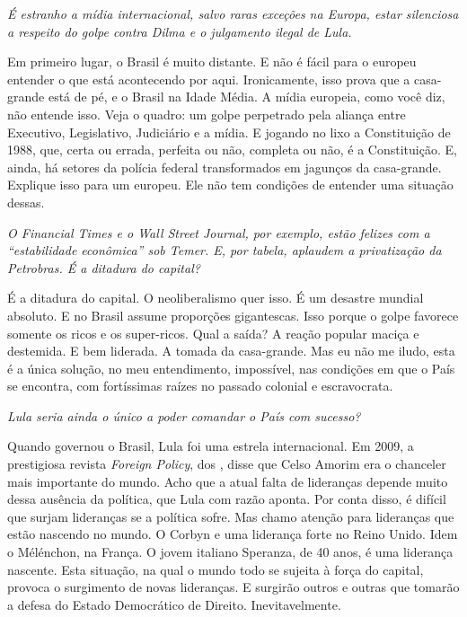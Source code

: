 \itshape
 É estranho a mídia internacional, salvo raras exceções
na Europa, estar silenciosa a respeito do golpe contra Dilma e o
julgamento ilegal de Lula.

\normalfont
Em primeiro lugar, o Brasil é muito distante. E não é
fácil para o europeu entender o que está acontecendo por aqui.
Ironicamente, isso prova que a casa-grande está de pé, e o Brasil na
Idade Média. A mídia europeia, como você diz, não entende isso. Veja o
quadro: um golpe perpetrado pela aliança entre Executivo, Legislativo,
Judiciário e a mídia. E jogando no lixo a Constituição de 1988, que,
certa ou errada, perfeita ou não, completa ou não, é a Constituição. E,
ainda, há setores da polícia federal transformados em jagunços da
casa-grande. Explique isso para um europeu. Ele não tem condições de
entender uma situação dessas.

\itshape
 O \emph{Financial Times} e o \emph{Wall Street
Journal}, por exemplo, estão felizes com a ``estabilidade econômica''
sob Temer. E, por tabela, aplaudem a privatização da Petrobras. É a
ditadura do capital?

\normalfont
É a ditadura do capital. O neoliberalismo quer isso. É um
desastre mundial absoluto. E no Brasil assume proporções gigantescas.
Isso porque o golpe favorece somente os ricos e os super-ricos. Qual a
saída? A reação popular maciça e destemida. E bem liderada. A tomada da
casa-grande. Mas eu não me iludo, esta é a única solução, no meu
entendimento, impossível, nas condições em que o País se encontra, com
fortíssimas raízes no passado colonial e escravocrata.

\itshape
 Lula seria ainda o único a poder comandar o País com
sucesso?

\normalfont
Quando governou o Brasil, Lula foi uma estrela
internacional. Em 2009, a prestigiosa revista \emph{Foreign Policy}, dos
, disse que Celso Amorim era o chanceler mais importante do mundo.
Acho que a atual falta de lideranças depende muito dessa ausência da
política, que Lula com razão aponta. Por conta disso, é difícil que
surjam lideranças se a política sofre. Mas chamo atenção para lideranças
que estão nascendo no mundo. O Corbyn e uma liderança forte no Reino
Unido. Idem o Mélénchon, na França. O jovem italiano Speranza, de 40
anos, é uma liderança nascente. Esta situação, na qual o mundo todo se
sujeita à força do capital, provoca o surgimento de novas lideranças. E
surgirão outros e outras que tomarão a defesa do Estado Democrático de
Direito. Inevitavelmente.

